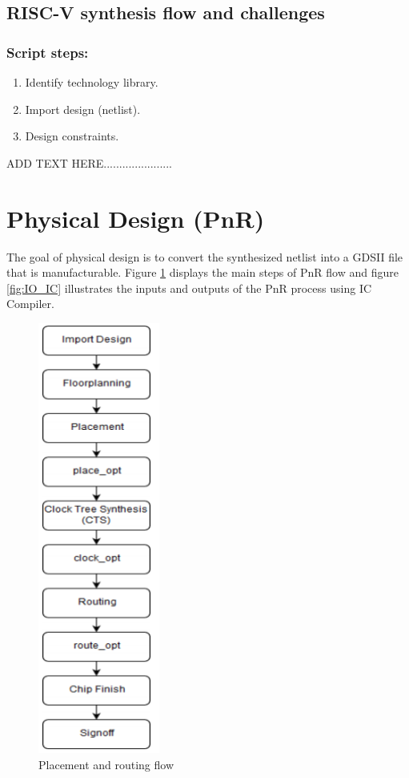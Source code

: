 \documentclass[../main.tex]{subfiles}
\begin{document}
\subsection{RISC-V synthesis flow and challenges}
\subsubsection{Script steps:}
\begin{enumerate}
\item  Identify technology library.
\item  Import design (netlist).
\item  Design constraints.
\end{enumerate}
ADD TEXT HERE......................
\section{Physical Design (PnR)}
The goal of physical design is to convert the synthesized netlist into a GDSII file that is 
manufacturable. Figure \ref{fig:PnR_flow} displays the main steps of PnR flow and figure \ref{fig:IO_IC} illustrates the inputs and outputs of the PnR process using IC Compiler.

\begin{figure}[h]
\centering
\includegraphics[width=4cm]{diagrams/PnR_flow.PNG}
\caption{Placement and routing flow}
\label{fig:PnR_flow}
\end{figure}
\end{document}
